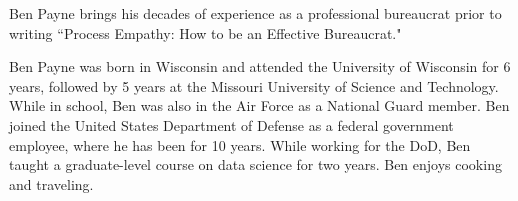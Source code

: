 
Ben Payne brings his decades of experience as a professional bureaucrat prior to writing ``Process Empathy: How to be an Effective Bureaucrat."

Ben Payne was born in Wisconsin and attended the University of Wisconsin for 6 years, followed by 5 years at the Missouri University of Science and Technology. While in school, Ben was also in the Air Force as a National Guard member. Ben joined the United States Department of Defense as a federal government employee, where he has been for 10 years. While working for the DoD, Ben taught a graduate-level course on data science for two years. Ben enjoys cooking and traveling. 

